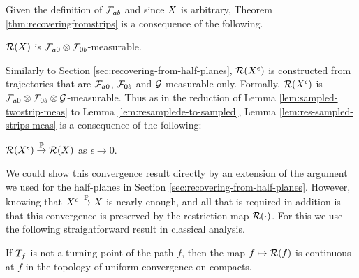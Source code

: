 {Given the definition of $\mathcal{F}_{a b}$ and since $X$ is
arbitrary, Theorem \ref{thm:recoveringfromstrips} is a consequence of
the following.
\begin{lemma}
  \label{lem:res-sampled-strips-meas}
  $\mathcal{R}(X)$ is $\mathcal{F}_{a 0} \otimes
  \mathcal{F}_{0 b}$-measurable.
\end{lemma}

\newcommand{\Resresamplede}{\Res{\resamplede}}
\newcommand{\Ressampled}{\Res{\sampled}}

Similarly to Section \ref{sec:recovering-from-half-planes}, $\Resresamplede$
is constructed from trajectories that are $\mathcal{F}_{a 0}$,
$\mathcal{F}_{0 b}$ and $\mathcal{G}$-measurable only.
Formally,
  $\mathcal{R}(X^{\epsilon})$ is $\mathcal{F}_{a 0} \otimes \mathcal{F}_{0 b}
  \otimes \mathcal{G}$-measurable.
Thus as in the reduction of Lemma \ref{lem:sampled-twostrip-meas} to
Lemma \ref{lem:resamplede-to-sampled}, Lemma
\ref{lem:res-sampled-strips-meas} is a consequence of the following:

\begin{lemma}
    \label{lem:resamplede-to-sampled-strip}
    $\mathcal{R}(X^{\epsilon}) \overset{\mathbb{P}}\to \mathcal{R}(X)$ as $\epsilon \to 0$.
\end{lemma}

We could show this convergence result
directly by an extension of the argument we used for the half-planes
in Section \ref{sec:recovering-from-half-planes}.  However, knowing that
$X^{\epsilon} \overset{\mathbb{P}}\to X$ is nearly enough, and all that is required
in addition is that this convergence is preserved by the
restriction map $\mathcal{R}(\cdot)$.
For this we use the following
straightforward result in classical analysis.

\newcommand{\stripleavetimenotturningpoint}[1]{$\stripleavetime{#1}$ is
  not a turning point of the path $#1$}

\begin{lemma}
  \label{lem:Res-continuous-ae}
  If \stripleavetimenotturningpoint{f},
  then the map $f \mapsto \mathcal{R}(f)$ is continuous at $f$ in the
  topology of uniform convergence on compacts.
\end{lemma}

\newcommand{\commenttom}[1]{}
\commenttom{
\DOTHIS{}{We decided to omit this proof -- ohad and tom
\DOTHIS{We sketch a proof.
\begin{proof}
    \newcommand{\fn}{f_n}

    \newcommand{\T}{\stripleavetime{f}}
    \newcommand{\Tn}{\stripleavetime{\fn}}
    \newcommand{\starttime}{s}


\end{proof}}}}}
